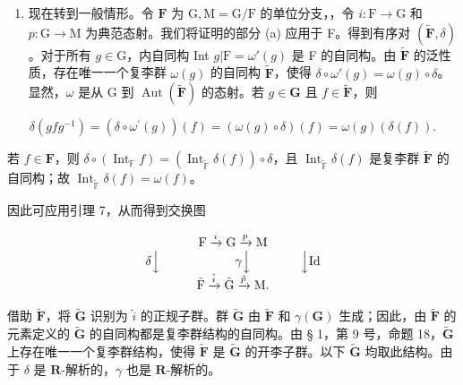 \begin{enumerate}
\def\labelenumi{(\alph{enumi})}
\setcounter{enumi}{1}
\tightlist
\item
  现在转到一般情形。令 \(\mathbf{F}\) 为 \(\mathrm{G},\mathrm{M} = \mathrm{G} / \mathrm{F}\) 的单位分支，，令 \(i\colon \mathrm{F}\to \mathrm{G}\) 和 \(p\colon \mathrm{G}\rightarrow \mathrm{M}\) 为典范态射。我们将证明的部分 (a) 应用于 F。得到有序对 \((\tilde{\mathbf{F}},\delta)\)。对于所有 \(g\in \mathrm{G}\)，内自同构 Int \(g|\mathrm{F} = \omega '(g)\) 是 F 的自同构。由 \(\tilde{\mathbf{F}}\) 的泛性质，存在唯一一个复李群 \(\omega (g)\) 的自同构 \(\tilde{\mathbf{F}}\)，使得 \(\delta \circ \omega '(g) = \omega (g)\circ \delta\)。显然，\(\omega\) 是从 G 到 \(\operatorname {Aut}(\tilde{\mathbf{F}})\) 的态射。若 \(g\in \mathbf{G}\) 且 \(f\in \tilde{\mathbf{F}}\)，则
\end{enumerate}

\[
\delta (g f g ^ {- 1}) = (\delta \circ \omega^ {\prime} (g)) (f) = (\omega (g) \circ \delta) (f) = \omega (g) (\delta (f)).
\]

若 \(f \in \mathbf{F}\)，则 \(\delta \circ (\operatorname{Int}_{\mathbb{F}} f) = (\operatorname{Int}_{\tilde{\mathbb{F}}} \delta(f)) \circ \delta\)，且 \(\operatorname{Int}_{\tilde{\mathbb{F}}} \delta(f)\) 是复李群 \(\tilde{\mathbf{F}}\) 的自同构；故 \(\operatorname{Int}_{\tilde{\mathbb{F}}} \delta(f) = \omega(f)\)。

因此可应用引理 7，从而得到交换图

\[
\begin{array}{c} \mathrm{F} \xrightarrow {i} \mathrm{G} \xrightarrow {p} \mathrm{M} \\ \delta \Big \downarrow \qquad \qquad \qquad \gamma \Big \downarrow \qquad \qquad \Big \downarrow \mathrm{Id} \\ \tilde {\mathrm{F}} \xrightarrow {\tilde {i}} \tilde {\mathrm{G}} \xrightarrow {\tilde {p}} \mathrm{M}. \end{array}
\]

借助 \(\tilde{\mathbf{F}}\)，将 \(\tilde{\mathbf{G}}\) 识别为 \(\tilde{i}\) 的正规子群。群 \(\tilde{\mathbf{G}}\) 由 \(\tilde{\mathbf{F}}\) 和 \(\gamma (\mathbf{G})\) 生成；因此，由 \(\tilde{\mathbf{F}}\) 的元素定义的 \(\tilde{\mathbf{G}}\) 的自同构都是复李群结构的自同构。由 § 1，第 9 号，命题 18，\(\tilde{\mathbf{G}}\) 上存在唯一一个复李群结构，使得 \(\tilde{\mathbf{F}}\) 是 \(\tilde{\mathbf{G}}\) 的开李子群。以下 \(\tilde{\mathbf{G}}\) 均取此结构。由于 \(\delta\) 是 \(\mathbf{R}\)-解析的，\(\gamma\) 也是 \(\mathbf{R}\)-解析的。

